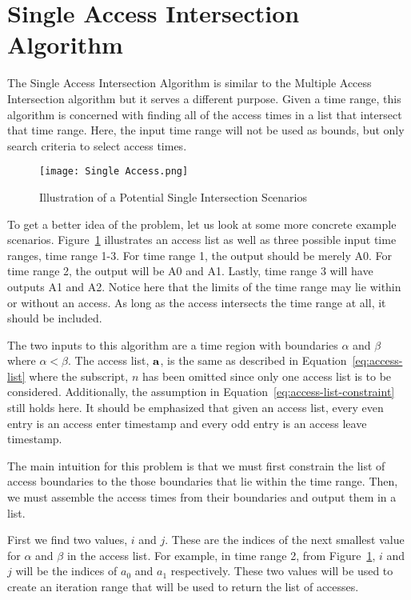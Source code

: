 
\section{Single Access Intersection Algorithm} \label{alg:contains}

The Single Access Intersection Algorithm is similar to the Multiple Access
Intersection algorithm but it serves a different purpose. Given a time range,
this algorithm is concerned with finding all of the access times in a list that
intersect that time range. Here, the input time range will not be used as
bounds, but only search criteria to select access times. 

\begin{figure}[h]
    \centering
    \texttt{[image: Single Access.png]} 
    \caption{Illustration of a Potential Single Intersection Scenarios}
    \label{fig:single-access-intersect}
\end{figure}

To get a better idea of the problem, let us look at some more concrete example
scenarios. Figure~\ref{fig:single-access-intersect} illustrates an access list
as well as three possible input time ranges, time range 1-3. For time range 1,
the output should be merely A0. For time range 2, the output will be A0 and A1.
Lastly, time range 3 will have outputs A1 and A2. Notice here that the limits
of the time range may lie within or without an access. As long as the access
intersects the time range at all, it should be included.

The two inputs to this algorithm are a time region with boundaries $\alpha$ and
$\beta$ where $\alpha < \beta$. The access list, $\bm{\mathrm{a}}$, is the same as
described in Equation~\ref{eq:access-list} where the subscript, $n$ has been
omitted since only one access list is to be considered. Additionally, the
assumption in Equation~\ref{eq:access-list-constraint} still holds here. It
should be emphasized that given an access list, every even entry is an access
enter timestamp and every odd entry is an access leave timestamp.

The main intuition for this problem is that we must first constrain the list of
access boundaries to the those boundaries that lie within the time range.
Then, we must assemble the access times from their boundaries and output them
in a list.  

First we find two values, $i$ and $j$.  These are the indices of the next
smallest value for $\alpha$ and $\beta$ in the access list.  For example, in
time range 2, from Figure~\ref{fig:single-access-intersect}, $i$ and $j$ will
be the indices of $a_0$ and $a_1$ respectively. These two values will be used
to create an iteration range that will be used to return the list of accesses. 


